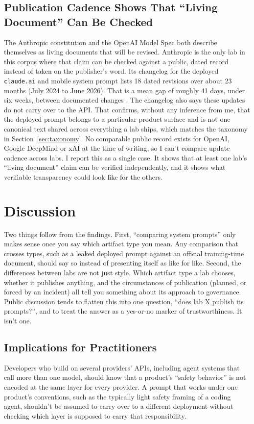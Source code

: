 \documentclass[11pt]{article}
\begin{document}
\subsection{Publication Cadence Shows That ``Living Document'' Can Be Checked}
\label{sec:cadence}
The Anthropic constitution and the OpenAI Model Spec both describe themselves as living documents that will be revised. Anthropic is the only lab in this corpus where that claim can be checked against a public, dated record instead of taken on the publisher's word. Its changelog for the deployed \texttt{claude.ai} and mobile system prompt lists 18 dated revisions over about 23 months (July 2024 to June 2026). That is a mean gap of roughly 41 days, under six weeks, between documented changes \citep{anthropic2026sysprompts}. The changelog also says these updates do not carry over to the API. That confirms, without any inference from me, that the deployed prompt belongs to a particular product surface and is not one canonical text shared across everything a lab ships, which matches the taxonomy in Section~\ref{sec:taxonomy}. No comparable public record exists for OpenAI, Google DeepMind or xAI at the time of writing, so I can't compare update cadence across labs. I report this as a single case. It shows that at least one lab's ``living document'' claim can be verified independently, and it shows what verifiable transparency could look like for the others.

\section{Discussion}

Two things follow from the findings. First, ``comparing system prompts'' only
makes sense once you say which artifact type you mean. Any comparison that
crosses types, such as a leaked deployed prompt against an official
training-time document, should say so instead of presenting itself as like for
like. Second, the differences between labs are not just style. Which artifact
type a lab chooses, whether it publishes anything, and the circumstances of
publication (planned, or forced by an incident) all tell you something about
its approach to governance. Public discussion tends to flatten this into one
question, ``does lab X publish its prompts?'', and to treat the answer as a
yes-or-no marker of trustworthiness. It isn't one.

\subsection{Implications for Practitioners}
Developers who build on several providers' APIs, including agent systems that
call more than one model, should know that a product's ``safety behavior'' is
not encoded at the same layer for every provider. A prompt that works under
one product's conventions, such as the typically light safety framing of a
coding agent, shouldn't be assumed to carry over to a different deployment
without checking which layer is supposed to carry that responsibility.
\end{document}
